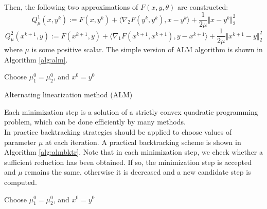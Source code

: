 {\begin{equation}
\begin{split}
\end{split}
\end{equation}
Then, the following two approximations of $F(x,y,\theta)$ are constructed:
\begin{equation}
Q^1_\mu (x,y^k) := F(x,y^k) + \langle\nabla_2F(y^k,y^k),x-y^k\rangle + \frac{1}{2\mu}\Vert x-y^k \Vert^2_2
\end{equation}
\begin{equation}
Q^2_\mu (x^{k+1},y) := F(x^{k+1},y) + \langle\nabla_1F(x^{k+1},x^{k+1}), y- x^{k+1}\rangle + \frac{1}{2\mu}\Vert x^{k+1}-y \Vert^2_2
\end{equation}
where $\mu$ is some positive scalar. The simple version of ALM algorithm is shown in Algorithm \ref{alg:alm}.

\begin{algorithm}
Choose $\mu_1^0 = \mu_2^0$, and $x^0 = y^0$\\
\caption{Alternating linearization method (ALM)}
\label{alg:alm}
\end{algorithm}

Each minimization step is a solution of a strictly convex quadratic programming problem, which can be done efficiently by many methods.\\ 
In practice backtracking strategies should be applied to choose values of parameter $\mu$ at each iteration. A practical backtracking scheme is shown in Algorithm \ref{alg:almbktr}. Note that in each minimization step, we check whether a sufficient reduction has been obtained. If so, the minimization step is accepted and $\mu$ remains the same, otherwise it is decreased and a new candidate step is computed.

\begin{algorithm}
Choose $\mu_1^0 = \mu_2^0$, and $x^0 = y^0$\\
\end{algorithm}}
